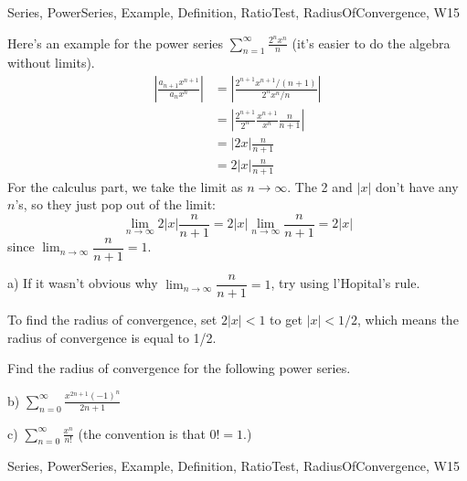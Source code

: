 \begin{tagblock}{Series, PowerSeries, Example, Definition, RatioTest, RadiusOfConvergence, W15}
\begin{question}
Here's an example for the power series $\displaystyle\sum_{n=1}^{\infty}\frac{2^nx^n}n$ (it's easier to do the algebra without limits).
\begin{align*}
\left|\frac{a_{n+1}x^{n+1}}{a_nx^n}\right|&=\left|\frac{2^{n+1}x^{n+1}/(n+1)}{2^nx^n/n}\right|\\
&=\left|\frac{2^{n+1}}{2^n}\frac {x^{n+1}}{x^n}\frac n {n+1}\right|\\
&=\left| 2x\right|\frac n {n+1}\\
&=2|x|\frac n {n+1}
\end{align*}
For the calculus part, we take the limit as $n\to\infty$. The 2 and $|x|$ don't have any $n$'s, so they just pop out of the limit:
\[
\lim_{n\to\infty}2|x|\frac n {n+1}=2|x|\lim_{n\to\infty}\frac n {n+1}=2|x|
\]
since $\displaystyle\lim_{n\to\infty}\dfrac n {n+1}=1$.

\bigskip

a) If it wasn't obvious why $\displaystyle\lim_{n\to\infty}\dfrac n {n+1}=1$, try using l'Hopital's rule. 

\bigskip

To find the radius of convergence, set $2|x|<1$ to get $|x|<1/2$, which means the radius of convergence is equal to 1/2.

\bigskip

Find the radius of convergence for the following power series. 

\bigskip

b) $\displaystyle\sum_{n=0}^{\infty}\frac{x^{2n+1}(-1)^n}{2n+1}$

\bigskip

c) $\displaystyle\sum_{n=0}^{\infty}\frac{x^n}{n!}$ (the convention is that $0!=1$.)
	
	
\begin{tags}
	    Series, PowerSeries, Example, Definition, RatioTest, RadiusOfConvergence, W15
\end{tags}
	
\begin{diary}
	    
\end{diary}
	
\begin{solution}
	   
\end{solution}
	
\end{question}

\end{tagblock}

